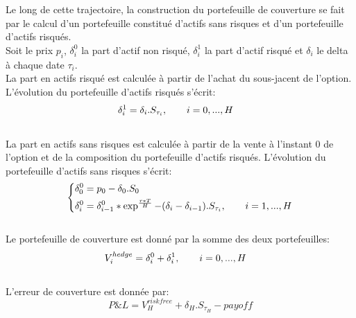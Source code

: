 \documentclass[french,12pt,a4paper]{article}
\begin{document}
Le long de cette trajectoire, la construction du portefeuille de couverture se fait par le calcul d'un portefeuille constitué d'actifs sans risques et d'un portefeuille d'actifs risqués.\\
Soit le prix $p_{i}$, $\delta_{i}^{0}$ la part d'actif non risqué, $\delta_{i}^{1}$ la part d'actif risqué et $\delta_{i}$ le delta à chaque date $\tau_{i}$. \\
La part en actifs risqué est calculée à partir de l'achat du sous-jacent de l'option. L'évolution du portefeuille d'actifs risqués s'écrit:\\
$$
     \vspace{-3ex}
        \begin{aligned}
          & \delta^{1}_{i} = \delta_{i}.S_{\tau_{i}}, \hspace{7 mm}  i=0,...,H 
        \end{aligned}
 $$
\\
La part en actifs sans risques est calculée à partir de la vente à l'instant 0 de l'option et de la composition du portefeuille d'actifs risqués. L'évolution du portefeuille d'actifs sans risques s'écrit:\\
$$
  \left\{%
     \vspace{-3ex}
        \begin{aligned}
          & \delta_{0}^{0} = p_{0}-\delta_{0}.S_{0} \\
          & \delta_{i}^{0} = \delta_{i-1}^{0}*\exp^{\frac{r*T}{H}}-(\delta_{i}-\delta_{i-1}).S_{\tau_{i}}, \hspace{7 mm}  i=1,...,H 
        \end{aligned}
 \right.
 $$
\\

Le portefeuille de couverture est donné par la somme des deux portefeuilles:
$$
	\vspace{-3ex}
        \begin{aligned}
          & V^{hedge}_{i} = \delta^{0}_{i} + \delta^{1}_{i}, \hspace{7 mm}  i=0,...,H 
        \end{aligned}
$$
\\
L'erreur de couverture est donnée par:
 $$P\&L = V^{risk free}_{H}+\delta_{H}.S_{\tau_{H}}-payoff$$
\end{document}
